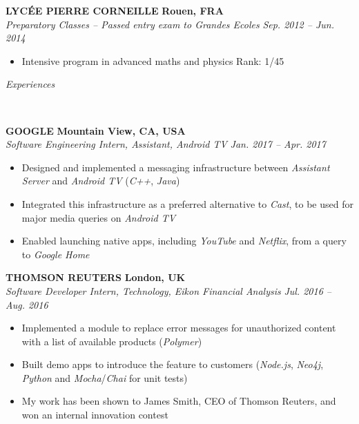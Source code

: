 \documentclass[a4paper, 12pt]{article}
\newcommand{\marginline}{-0.3cm}
\newcommand{\margincontent}{-0.6cm}
\newcommand{\marginbeforesection}{0.25cm}
\newcommand{\linewidthperso}{0.02cm}
\newcommand{\styletitle}[1]{\textbf{#1}}
\newcommand{\styledesc}[1]{\textit{#1}}
\newcommand{\styleloc}[1]{\textbf{#1}}
\newcommand{\styledates}[1]{\textit{#1}}
\newcommand{\stylesection}[1]{
  \vspace{\marginbeforesection}
  \begin{normalsize}\textit{#1}\end{normalsize}
  \vspace{\marginline}\\
  \noindent\makebox[\linewidth]{\rule{\textwidth}{\linewidthperso}}

}
\begin{document}
\begin{footnotesize}
\styletitle{LYC\'EE PIERRE CORNEILLE} \hfill \styleloc{Rouen, FRA}\\
\styledesc{Preparatory Classes -- Passed entry exam to Grandes Ecoles} \hfill \styledates{Sep. 2012 -- Jun. 2014}\\
\vspace{\margincontent}
\begin{itemize}
  \item Intensive program in advanced maths and physics \hfill Rank: 1/45
\end{itemize}

\stylesection{Experiences}

\styletitle{GOOGLE} \hfill \styleloc{Mountain View, CA, USA}\\ 
\styledesc{Software Engineering Intern, Assistant, Android TV} \hfill \styledates{Jan. 2017 -- Apr. 2017}\\
\vspace{\margincontent}
\begin{itemize}
  \item Designed and implemented a messaging infrastructure between \textit{Assistant Server} and \textit{Android TV} (\textit{C++}, \textit{Java})
  \item Integrated this infrastructure as a preferred alternative to \textit{Cast}, to be used for major media queries on \textit{Android TV}
  \item Enabled launching native apps, including \textit{YouTube} and \textit{Netflix}, from a query to \textit{Google Home}
\end{itemize}

\styletitle{THOMSON REUTERS} \hfill \styleloc{London, UK}\\ 
\styledesc{Software Developer Intern, Technology, Eikon Financial Analysis} \hfill \styledates{Jul. 2016 -- Aug. 2016}\\
\vspace{\margincontent}
\begin{itemize}
  \item Implemented a module to replace error messages for unauthorized content with a list of available products (\textit{Polymer})
  \item Built demo apps to introduce the feature to customers (\textit{Node.js}, \textit{Neo4j}, \textit{Python} and \textit{Mocha}/\textit{Chai} for unit tests)
  \item My work has been shown to James Smith, CEO of Thomson Reuters, and won an internal innovation contest
\end{itemize}


\end{footnotesize}
\end{document}
